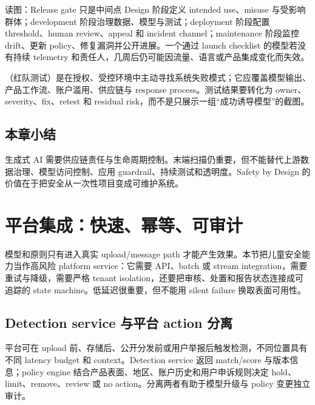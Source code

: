 \documentclass[a4paper]{article}
\begin{document}
\begin{knowledgebox}{读图：Release gate 只是中间点}
Design 阶段定义 intended use、misuse 与受影响群体；development 阶段治理数据、模型与测试；deployment 阶段配置 threshold、human review、appeal 和 incident channel；maintenance 阶段监控 drift、更新 policy、修复漏洞并公开进展。一个通过 launch checklist 的模型若没有持续 telemetry 和责任人，几周后仍可能因流量、语言或产品集成变化而失效。
\end{knowledgebox}

（红队测试）是在授权、受控环境中主动寻找系统失败模式；它应覆盖模型输出、产品工作流、账户滥用、供应链与 response process。测试结果要转化为 owner、severity、fix、retest 和 residual risk，而不是只展示一组“成功诱导模型”的截图。


\subsection{本章小结}

生成式 AI 需要供应链责任与生命周期控制。末端扫描仍重要，但不能替代上游数据治理、模型访问控制、应用 guardrail、持续测试和透明度。Safety by Design 的价值在于把安全从一次性项目变成可维护系统。

\section{平台集成：快速、幂等、可审计}

模型和原则只有进入真实 upload/message path 才能产生效果。本节把儿童安全能力当作高风险 platform service：它需要 API、batch 或 stream integration，需要重试与降级，需要严格 tenant isolation，还要把审核、处置和报告状态连接成可追踪的 state machine。低延迟很重要，但不能用 silent failure 换取表面可用性。

\subsection{Detection service 与平台 action 分离}

平台可在 upload 前、存储后、公开分发前或用户举报后触发检测，不同位置具有不同 latency budget 和 context。Detection service 返回 match/score 与版本信息；policy engine 结合产品表面、地区、账户历史和用户申诉规则决定 hold、limit、remove、review 或 no action。分离两者有助于模型升级与 policy 变更独立审计。
\end{document}
